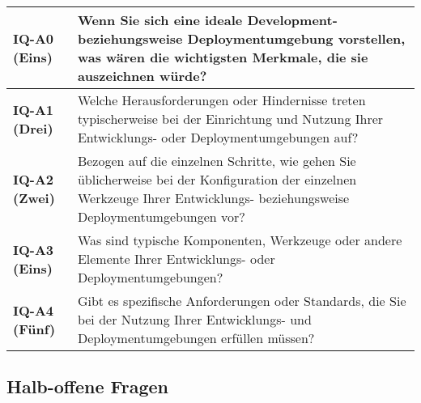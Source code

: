 \begin{table}[H]
    \centering
    \begin{tabular}{ >{\raggedright\bfseries}p{} p{} }
        IQ-A0 (Eins) & 
        Wenn Sie sich eine ideale Development- beziehungsweise Deploymentumgebung vorstellen, was wären die wichtigsten Merkmale, die sie auszeichnen würde? \\
        \hline
        IQ-A1 (Drei) &
        Welche Herausforderungen oder Hindernisse treten typischerweise bei der Einrichtung und Nutzung Ihrer Entwicklungs- oder Deploymentumgebungen auf? \\
        \hline
        IQ-A2 (Zwei) &
        Bezogen auf die einzelnen Schritte, wie gehen Sie üblicherweise bei der Konfiguration der einzelnen Werkzeuge Ihrer Entwicklungs- beziehungsweise Deploymentumgebungen vor? \\
        \hline
        IQ-A3 (Eins) &
        Was sind typische Komponenten, Werkzeuge oder andere Elemente Ihrer Entwicklungs- oder Deploymentumgebungen? \\
        \hline
        IQ-A4 (Fünf) &
        Gibt es spezifische Anforderungen oder Standards, die Sie bei der Nutzung Ihrer Entwicklungs- und Deploymentumgebungen erfüllen müssen? \\
    \end{tabular}
\end{table}

\subsection{Halb-offene Fragen}
\label{subsec:AA-01-02_half-open-questions}

